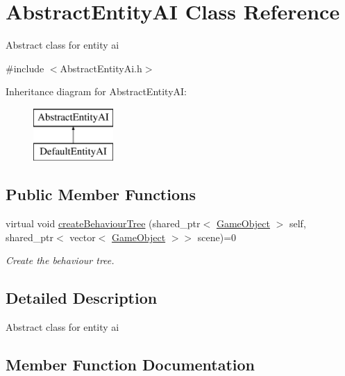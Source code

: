 \hypertarget{class_abstract_entity_a_i}{}\section{Abstract\+Entity\+AI Class Reference}
\label{class_abstract_entity_a_i}


Abstract class for entity ai  




{\ttfamily \#include $<$Abstract\+Entity\+Ai.\+h$>$}

Inheritance diagram for Abstract\+Entity\+AI\+:\begin{figure}[H]
\begin{center}
\leavevmode
\includegraphics[height=2.000000cm]{class_abstract_entity_a_i}
\end{center}
\end{figure}
\subsection*{Public Member Functions}
\begin{DoxyCompactItemize}
\item 
virtual void \mbox{\hyperlink{class_abstract_entity_a_i_a8dd5f0ed0b97b8089b1e0a7e67754bff}{create\+Behaviour\+Tree}} (shared\+\_\+ptr$<$ \mbox{\hyperlink{class_game_object}{Game\+Object}} $>$ self, shared\+\_\+ptr$<$ vector$<$ \mbox{\hyperlink{class_game_object}{Game\+Object}} $>$$>$ scene)=0
\begin{DoxyCompactList}\small\item\em Create the behaviour tree. \end{DoxyCompactList}\end{DoxyCompactItemize}


\subsection{Detailed Description}
Abstract class for entity ai 



\subsection{Member Function Documentation}
\mbox{\label{class_abstract_entity_a_i_a8dd5f0ed0b97b8089b1e0a7e67754bff}} 
